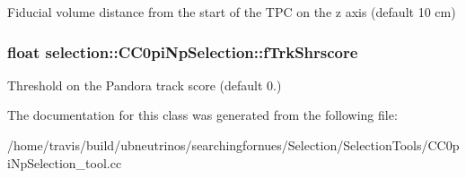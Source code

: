 Fiducial volume distance from the start of the T\-P\-C on the z axis (default 10 cm) \hypertarget{classselection_1_1CC0piNpSelection_ab72eccf7dab3acafa294a0d8f3e225a0}{
\subsubsection[{f\-Trk\-Shrscore}]{\setlength{\rightskip}{0pt plus 5cm}float selection\-::\-C\-C0pi\-Np\-Selection\-::f\-Trk\-Shrscore\hspace{0.3cm}{\ttfamily [private]}}}\label{classselection_1_1CC0piNpSelection_ab72eccf7dab3acafa294a0d8f3e225a0}
Threshold on the Pandora track score (default 0.) 

The documentation for this class was generated from the following file\-:\begin{DoxyCompactItemize}
\item 
/home/travis/build/ubneutrinos/searchingfornues/\-Selection/\-Selection\-Tools/C\-C0pi\-Np\-Selection\-\_\-tool.\-cc\end{DoxyCompactItemize}
